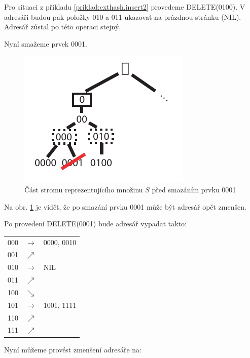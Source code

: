\begin{priklad}
Pro situaci z příkladu \ref{priklad:exthash.insert2} provedeme
DELETE(0100). V adresáři budou pak položky 010 a 011 ukazovat na prázdnou
stránku (NIL). Adresář zůstal po této operaci stejný.

Nyní smažeme prvek 0001.

\begin{figure}[!htb]
\centering\includegraphics{pics/exthash-del}
\caption{Část stromu reprezentujícího množinu $S$ před smazáním prvku 0001}
\label{fig.hash.extern.del}
\end{figure}

Na obr. \ref{fig.hash.extern.del} je vidět, že po smazání prvku 
0001 může být adresář opět zmenšen.

Po provedení DELETE(0001) bude adresář vypadat takto:

\vspace{5mm}

\begin{tabular}{lll}
000 & $\rightarrow$ & 0000, 0010 \\
001 & $\nearrow$ & \\
\hline
010 & $\rightarrow$ & NIL \\
011 & $\nearrow$ & \\
\hline
100 & $\searrow$ & \\
101 & $\rightarrow$ &  1001, 1111 \\
110 & $\nearrow$ & \\
111 & $\nearrow$ & \\
\end{tabular}

\vspace{5mm}

Nyní můžeme provést zmenšení adresáře na:

\vspace{5mm}


\end{priklad}

